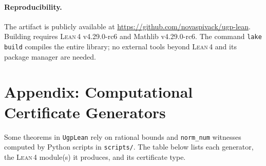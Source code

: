 \documentclass[11pt,a4paper]{article}
\theoremstyle{definition}
\newcommand{\lean}{\textsc{Lean}\,4}
\begin{document}
\paragraph{Reproducibility.}
The artifact is publicly available at
\url{https://github.com/novaspivack/ugp-lean}.  Building requires
\lean{} v4.29.0-rc6 and Mathlib v4.29.0-rc6.  The command
\texttt{lake build} compiles the entire library; no external tools
beyond \lean{} and its package manager are needed.

\bigskip



\clearpage
\section*{Appendix: Computational Certificate Generators}

Some theorems in \texttt{UgpLean} rely on rational bounds and \texttt{norm\_num}
witnesses computed by Python scripts in \texttt{scripts/}.  The table below lists
each generator, the \lean{} module(s) it produces, and its certificate type.
\end{document}
